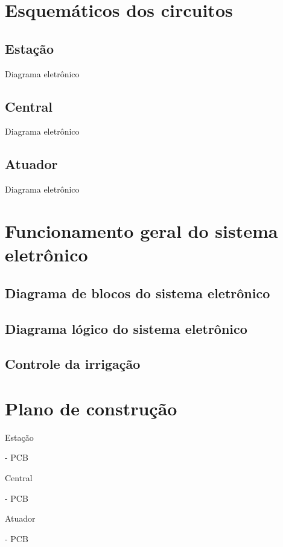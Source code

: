 \section{Esquemáticos dos circuitos}

	\subsection{Estação}
		
		Diagrama eletrônico		
		
	\subsection{Central}
	
		Diagrama eletrônico
		
	\subsection{Atuador}

		Diagrama eletrônico

\section{Funcionamento geral do sistema eletrônico}

	\subsection{Diagrama de blocos do sistema eletrônico}

	\subsection{Diagrama lógico do sistema eletrônico}

	\subsection{Controle da irrigação}


\section{Plano de construção}

	Estação
		
		- PCB
	
	Central
		
		- PCB
		
	Atuador
	
		- PCB


